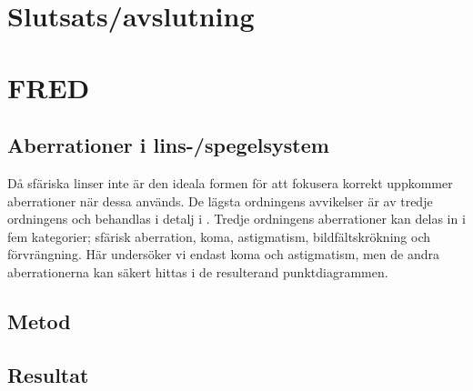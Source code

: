 \documentclass[a4paper]{article}
\begin{document}
  
  
  
  
  
  

\section{Slutsats/avslutning}

\section{FRED}


\subsection{Aberrationer i lins-/spegelsystem}

Då sfäriska linser inte är den ideala formen för att fokusera korrekt uppkommer aberrationer när dessa används. De lägsta ordningens avvikelser är av tredje ordningens och behandlas i detalj i \cite[Kapitel~20]{pearsonIntroOpt}. Tredje ordningens aberrationer kan delas in i fem kategorier; sfärisk aberration, koma, astigmatism, bildfältskrökning och förvrängning. Här undersöker vi endast koma och astigmatism, men de andra aberrationerna kan säkert hittas i de resulterand punktdiagrammen.

\subsection{Metod}



\subsection{Resultat}
\end{document}
